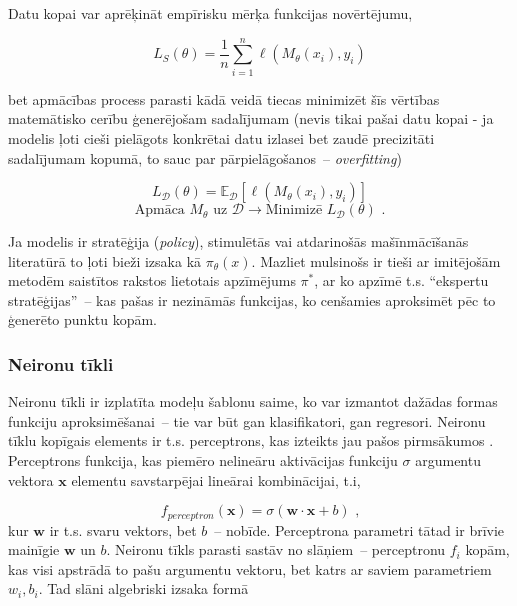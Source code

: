 \documentclass[12pt, a4paper]{article}
\numberwithin{equation}{section} %
\begin{document}
Datu kopai var aprēķināt empīrisku mērķa funkcijas novērtējumu,

\begin{equation} 
    L_S(\theta) = \frac{1}{n}\sum_{i=1}^n\ell(M_{\theta}(x_i), y_i)
\end{equation}

bet apmācības process parasti kādā veidā tiecas minimizēt šīs vērtības matemātisko cerību ģenerējošam sadalījumam (nevis tikai pašai datu kopai - ja modelis ļoti cieši pielāgots konkrētai datu izlasei bet zaudē precizitāti sadalījumam kopumā, to sauc par pārpielāgošanos~-- \textit{overfitting})

\begin{equation} 
    L_{\mathcal{D}}(\theta) = \mathbb{E}_{\mathcal{D}} [\ell(M_{\theta}(x_i), y_i)]
\end{equation}
\begin{equation} 
    \text{Apmāca } M_{\theta} \text{ uz } \mathcal{D} \rightarrow \text{Minimizē } L_{\mathcal{D}}(\theta)
\text{ .}
\end{equation}

Ja modelis ir stratēģija (\textit{policy}), stimulētās vai atdarinošās mašīnmācīšanās literatūrā to ļoti bieži izsaka kā $\pi_{\theta}(x)$. Mazliet mulsinošs ir tieši ar imitējošām metodēm saistītos rakstos lietotais apzīmējums $\pi^*$, ar ko apzīmē t.s. ``ekspertu stratēģijas''~-- kas pašas ir nezināmās funkcijas, ko cenšamies aproksimēt pēc to ģenerēto punktu kopām. 

\subsubsection{Neironu tīkli}

Neironu tīkli ir izplatīta modeļu šablonu saime, ko var izmantot dažādas formas funkciju aproksimēšanai~-- tie var būt gan klasifikatori, gan regresori. Neironu tīklu kopīgais elements ir t.s. perceptrons, kas izteikts jau pašos pirmsākumos \cite{mcculloch1943logical}. Perceptrons funkcija, kas piemēro nelineāru aktivācijas funkciju $\sigma$ argumentu vektora $ \boldsymbol{x}$ elementu savstarpējai lineārai kombinācijai, t.i,


\begin{equation} 
    f_{perceptron}( \boldsymbol{x}) = \sigma( \boldsymbol{w} \cdot  \boldsymbol{x}+b)
\text{ ,}
\end{equation}
kur $ \boldsymbol{w}$ ir t.s. svaru vektors, bet $b$~--  nobīde. Perceptrona parametri tātad ir brīvie mainīgie $ \boldsymbol{w}$ un $b$. Neironu tīkls parasti sastāv no slāņiem~-- perceptronu $f_i$ kopām, kas visi apstrādā to pašu argumentu vektoru, bet katrs ar saviem parametriem $w_i,b_i$. Tad slāni algebriski izsaka formā
\end{document}
